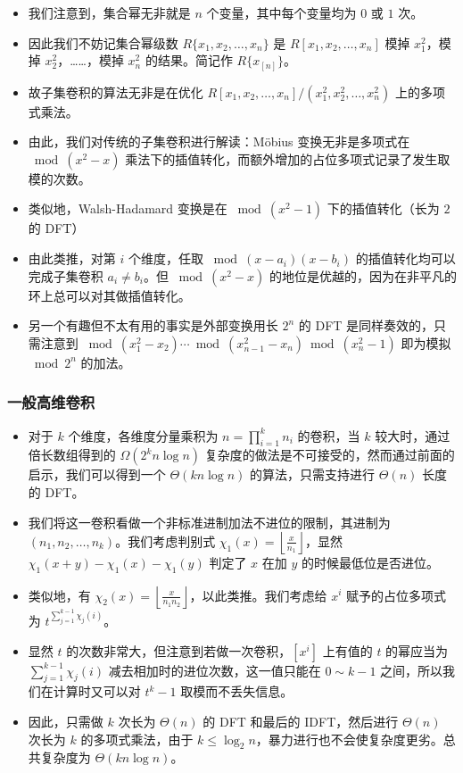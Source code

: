 \documentclass[mathserif]{ctexbeamer}
\begin{document}
\frame
{
  \begin{itemize}
  \item<1-> 我们注意到，集合幂无非就是 $n$ 个变量，其中每个变量均为 $0$ 或 $1$ 次。
  \item<2-> 因此我们不妨记集合幂级数 $R\{x_1, x_2, \dots, x_n\}$ 是 $R[x_1, x_2, \dots, x_n]$ 模掉 $x_1^2$，模掉 $x_2^2$，……，模掉 $x_n^2$ 的结果。简记作 $R\{x_{[n]}\}$。
  \item<3-> 故子集卷积的算法无非是在优化 $R[x_1, x_2, \dots, x_n]/(x_1^2,x_2^2,\dots,x_n^2)$ 上的多项式乘法。
  \end{itemize}
}

\frame
{
  \begin{itemize}
  \item<1-> 由此，我们对传统的子集卷积进行解读：M\"obius 变换无非是多项式在 $\bmod (x^2-x)$ 乘法下的插值转化，而额外增加的占位多项式记录了发生取模的次数。
  \item<2-> 类似地，Walsh-Hadamard 变换是在 $\bmod (x^2-1)$ 下的插值转化（长为 $2$ 的 DFT）
  \item<3-> 由此类推，对第 $i$ 个维度，任取 $\bmod (x-a_i)(x-b_i)$ 的插值转化均可以完成子集卷积 $a_i\neq b_i$。但 $\bmod (x^2-x)$ 的地位是优越的，因为在非平凡的环上总可以对其做插值转化。
  \item<4-> 另一个有趣但不太有用的事实是外部变换用长 $2^n$ 的 DFT 是同样奏效的，只需注意到 $\bmod (x_1^2 - x_{2}) \cdots \bmod (x_{n-1}^2 - x_n) \bmod (x_n^2 - 1)$ 即为模拟 $\bmod 2^n$ 的加法。
  \end{itemize}
}

\frame
{
  \frametitle{一般高维卷积}
  \begin{itemize}
  \item<1-> 对于 $k$ 个维度，各维度分量乘积为 $n = \prod_{i=1}^k n_i$ 的卷积，当 $k$ 较大时，通过倍长数组得到的 $\Omega(2^k n\log n)$ 复杂度的做法是不可接受的，然而通过前面的启示，我们可以得到一个 $\Theta(kn\log n)$ 的算法，只需支持进行 $\Theta(n)$ 长度的 DFT。
  \item<2-> 我们将这一卷积看做一个非标准进制加法不进位的限制，其进制为 $(n_1,n_2,\dots,n_k)$。我们考虑判别式 $\chi_1(x) = \left\lfloor\frac x {n_1}\right\rfloor$，显然 $\chi_1(x+y)-\chi_1(x)-\chi_1(y)$ 判定了 $x$ 在加 $y$ 的时候最低位是否进位。
  \end{itemize}
}

\frame
{
  \begin{itemize}
  \item<1-> 类似地，有 $\chi_2(x) = \left\lfloor\frac x {n_1n_2}\right\rfloor$，以此类推。我们考虑给 $x^i$ 赋予的占位多项式为 $t^{\sum_{j=1}^{k-1} \chi_j(i)}$。
  \item<2-> 显然 $t$ 的次数非常大，但注意到若做一次卷积，$[x^i]$ 上有值的 $t$ 的幂应当为 $\sum_{j=1}^{k-1} \chi_j(i)$ 减去相加时的进位次数，这一值只能在 $0\sim k-1$ 之间，所以我们在计算时又可以对 $t^k-1$ 取模而不丢失信息。
  \item<3-> 因此，只需做 $k$ 次长为 $\Theta(n)$ 的 DFT 和最后的 IDFT，然后进行 $\Theta(n)$ 次长为 $k$ 的多项式乘法，由于 $k \le \log_2 n$，暴力进行也不会使复杂度更劣。总共复杂度为 $\Theta(kn\log n)$。
  \end{itemize}
}
\end{document}
